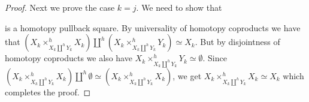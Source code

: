 \begin{corollary}
\begin{proof}
        Next we prove the case $k=j$.
        We need to show that
        \begin{center}
        \end{center}
        is a homotopy pullback square.
        By universality of homotopy coproducts we have that $\left(X_k\times_{X_k\coprod^h Y_k}^h X_k\right)\coprod^h\left(X_k\times_{X_k\coprod^h Y_k}^hY_k\right)\simeq X_k$.
        But by disjointness of homotopy coproducts we also have $X_k\times_{X_k\coprod^h Y_k}^hY_k\simeq\emptyset$.
        Since $\left(X_k\times_{X_k\coprod^h Y_k}^h X_k\right)\coprod^h\emptyset\simeq\left(X_k\times_{X_k\coprod^h Y_k}^hX_k\right)$, we get $X_k\times_{X_k\coprod^h Y_k}^hX_k\simeq X_k$ which completes the proof.
    \end{proof}
\end{corollary}
